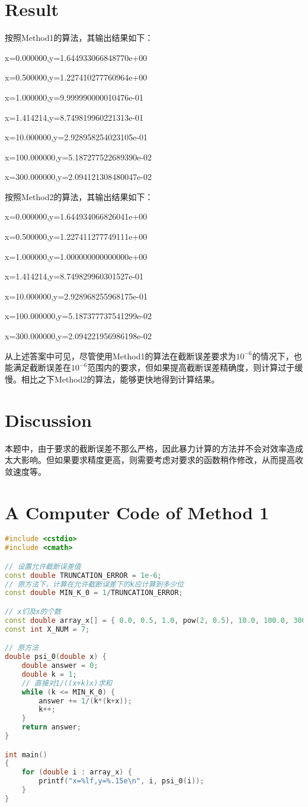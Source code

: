 \documentclass[UTF8]{article}
\begin{document}
\section{Result}
按照Method1的算法，其输出结果如下：\par
\qquad x=0.000000,y=1.644933066848770e+00\par
\qquad x=0.500000,y=1.227410277760964e+00\par
\qquad x=1.000000,y=9.999990000010476e-01\par
\qquad x=1.414214,y=8.749819960221313e-01\par
\qquad x=10.000000,y=2.928958254023105e-01\par
\qquad x=100.000000,y=5.187277522689390e-02\par
\qquad x=300.000000,y=2.094121308480047e-02\par
\vspace{1cm}
按照Method2的算法，其输出结果如下：\par
\qquad x=0.000000,y=1.644934066826041e+00\par
\qquad x=0.500000,y=1.227411277749111e+00\par
\qquad x=1.000000,y=1.000000000000000e+00\par
\qquad x=1.414214,y=8.749829960301527e-01\par
\qquad x=10.000000,y=2.928968255968175e-01\par
\qquad x=100.000000,y=5.187377737541299e-02\par
\qquad x=300.000000,y=2.094221956986198e-02\par

从上述答案中可见，尽管使用Method1的算法在截断误差要求为$10^{-6}$的情况下，也能满足截断误差在$10^{-6}$范围内的要求，但如果提高截断误差精确度，则计算过于缓慢。相比之下Method2的算法，能够更快地得到计算结果。
\section{Discussion}
本题中，由于要求的截断误差不那么严格，因此暴力计算的方法并不会对效率造成太大影响。但如果要求精度更高，则需要考虑对要求的函数稍作修改，从而提高收敛速度等。

\section*{A Computer Code of Method 1}
\begin{lstlisting}[language=C++]
#include <cstdio>
#include <cmath>

// 设置允许截断误差值
const double TRUNCATION_ERROR = 1e-6;
// 原方法下，计算在允许截断误差下的k应计算到多少位
const double MIN_K_0 = 1/TRUNCATION_ERROR;

// x们及x的个数
const double array_x[] = { 0.0, 0.5, 1.0, pow(2, 0.5), 10.0, 100.0, 300.0 };
const int X_NUM = 7;

// 原方法
double psi_0(double x) {
	double answer = 0;
	double k = 1;
	// 直接对1/((x+k)x)求和
	while (k <= MIN_K_0) {
		answer += 1/(k*(k+x));
		k++;
	}
	return answer;
}

int main()
{
	for (double i : array_x) {
		printf("x=%lf,y=%.15e\n", i, psi_0(i));
	}
}
\end{lstlisting}
\end{document}

